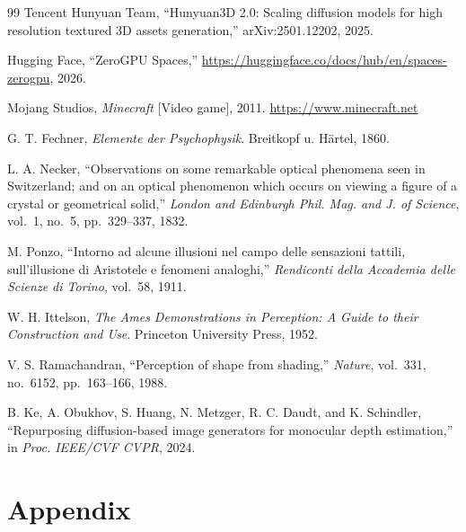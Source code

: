 \documentclass[10pt,twocolumn]{article}
\begin{document}
\begin{thebibliography}{99}
Tencent Hunyuan Team, ``Hunyuan3D 2.0: Scaling diffusion models for high
resolution textured 3D assets generation,'' arXiv:2501.12202, 2025.

Hugging Face, ``ZeroGPU Spaces,''
\url{https://huggingface.co/docs/hub/en/spaces-zerogpu}, 2026.

Mojang Studios, \emph{Minecraft} [Video game], 2011.
\url{https://www.minecraft.net}

G. T. Fechner, \emph{Elemente der Psychophysik}.
Breitkopf u. Härtel, 1860.

L. A. Necker, ``Observations on some remarkable optical phenomena seen in
Switzerland; and on an optical phenomenon which occurs on viewing a figure
of a crystal or geometrical solid,'' \emph{London and Edinburgh Phil. Mag. and
J. of Science}, vol.~1, no.~5, pp.~329--337, 1832.

M. Ponzo, ``Intorno ad alcune illusioni nel campo delle sensazioni tattili,
sull'illusione di Aristotele e fenomeni analoghi,''
\emph{Rendiconti della Accademia delle Scienze di Torino}, vol.~58, 1911.

W. H. Ittelson, \emph{The Ames Demonstrations in Perception: A Guide to their
Construction and Use}. Princeton University Press, 1952.

V. S. Ramachandran, ``Perception of shape from shading,''
\emph{Nature}, vol.~331, no.~6152, pp.~163--166, 1988.

B. Ke, A. Obukhov, S. Huang, N. Metzger, R. C. Daudt, and K. Schindler,
``Repurposing diffusion-based image generators for monocular depth
estimation,'' in \emph{Proc. IEEE/CVF CVPR}, 2024.

\end{thebibliography}


\section*{Appendix}



\end{document}
